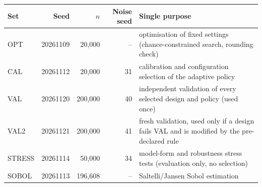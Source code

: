 \begin{tabular}{lrrrp{7.4cm}}
\toprule
Set & Seed & $n$ & Noise seed & Single purpose \\
\midrule
OPT & 20261109 & 20,000 & -- & optimisation of fixed settings (chance-constrained search, rounding check) \\
CAL & 20261112 & 20,000 & 31 & calibration and configuration selection of the adaptive policy \\
VAL & 20261120 & 200,000 & 40 & independent validation of every selected design and policy (used once) \\
VAL2 & 20261121 & 200,000 & 41 & fresh validation, used only if a design fails VAL and is modified by the pre-declared rule \\
STRESS & 20261114 & 50,000 & 34 & model-form and robustness stress tests (evaluation only, no selection) \\
SOBOL & 20261113 & 196,608 & -- & Saltelli/Jansen Sobol estimation \\
\bottomrule
\end{tabular}
